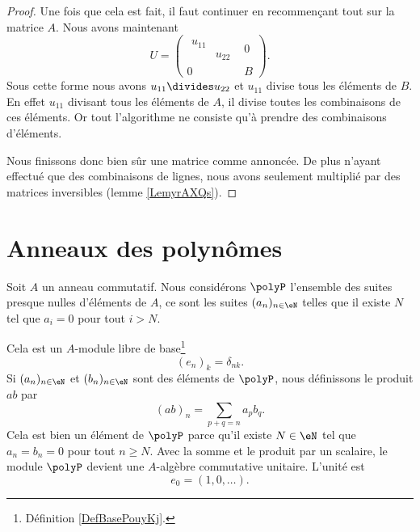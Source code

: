 \begin{proof}
    Une fois que cela est fait, il faut continuer en recommençant tout sur la matrice \( A\). Nous avons maintenant
    \begin{equation}
        U=\begin{pmatrix}
            \begin{matrix}
                u_{11}  &       \\ 
                &   u_{22}    
            \end{matrix}&   0    \\ 
            0    &   B    
        \end{pmatrix}.
    \end{equation}
    Sous cette forme nous avons \( u_{11}\divides u_{22}\) et \( u_{11}\) divise tous les éléments de \( B\). En effet \( u_{11}\) divisant tous les éléments de \( A\), il divise toutes les combinaisons de ces éléments. Or tout l'algorithme ne consiste qu'à prendre des combinaisons d'éléments.

    Nous finissons donc bien sûr une matrice comme annoncée. De plus n'ayant effectué que des combinaisons de lignes, nous avons seulement multiplié par des matrices inversibles (lemme \ref{LemyrAXQs}).
\end{proof}

\section{Anneaux des polynômes}

Soit \( A\) un anneau commutatif. Nous considérons \( \polyP\) l'ensemble des suites presque nulles d'éléments de \( A\), ce sont les suites \( (a_n)_{n\in\eN}\) telles que il existe \( N\) tel que \( a_i=0\) pour tout \( i>N\).

Cela est un \( A\)-module libre de base\footnote{Définition \ref{DefBasePouyKj}.}
\begin{equation}
    (e_n)_k=\delta_{nk}.
\end{equation}
Si \( (a_n)_{n\in \eN}\) et \( (b_n)_{n\in\eN}\) sont des éléments de \( \polyP\), nous définissons le produit \( ab\) par
\begin{equation}
    (ab)_n=\sum_{p+q=n}a_pb_q.
\end{equation}
Cela est bien un élément de \( \polyP\) parce qu'il existe \( N\in\eN\) tel que \( a_n=b_n=0\) pour tout \( n\geq N\). Avec la somme et le produit par un scalaire, le module \( \polyP\) devient une \( A\)-algèbre commutative unitaire. L'unité est 
\begin{equation}
    e_0=(1,0,\ldots).
\end{equation}

